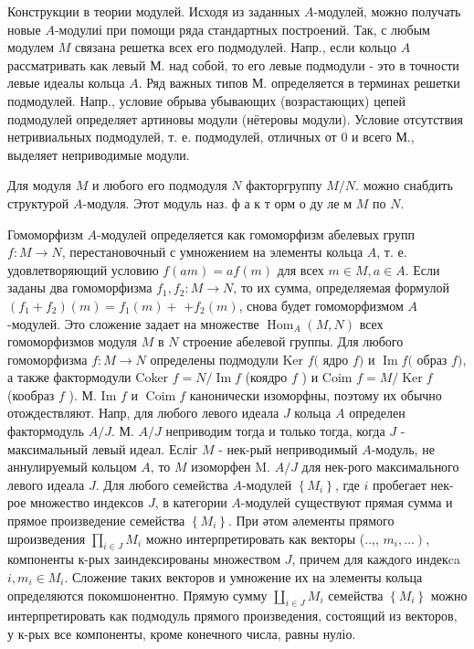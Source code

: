 \documentclass[10pt]{article}
\begin{document}
Конструкции в теории модулей. Исходя из заданных $A$-модулей, можно получать новые $A$-модулиі при помощи ряда стандартных построений. Так, с любым модулем $M$ связана решетка всех его подмодулей. Напр., если кольцо $A$ рассматривать как левый $М$. над собой, то его левые подмодули - это в точности левые идеалы кольца $A$. Ряд важных типов М. определяется в терминах решетки подмодулей. Напр., условие обрыва убывающих (возрастающих) цепей подмодулей определяет артиновы модули (нётеровы модули). Условие отсутствия нетривиальных подмодулей, т. е. подмодулей, отличных от 0 и всего М., выделяет неприводимые модули.



Для модуля $M$ и любого его подмодуля $N$ факторгруппу $M / N$. можно снабдить структурой $A$-модуля. Этот модуль наз. ф а к т орм о ду ле м $M$ по $N$.



Гомоморфизм $A$-модулей определяется как гомоморфизм абелевых групп $f: M \rightarrow N$, перестановочный с умножением на элементы кольца $A$, т. е. удовлетворяющий условию $f(a m)=a f(m)$ для всех $m \in M, a \in A$. Если заданы два гомоморфизма $f_{1}, f_{2}: M \rightarrow N$, то их сумма, определяемая формулой $\left(f_{1}+f_{2}\right)(m)=f_{1}(m)+$ $+f_{2}(m)$, снова будет гомоморфизмом $A$-модулей. Это сложение задает на множестве $\operatorname{Hom}_{A}(M, N)$ всех гомоморфизмов модуля $M$ в $N$ строение абелевой группы. Для любого гомоморфизма $f: M \rightarrow N$ определены подмодули Ker $f($ ядро $f)$ и $\operatorname{Im} f($ образ $f)$, а также фактормодули Coker $f=N / \operatorname{Im} f$ (коядро $f$ ) и Coim $f=M / \operatorname{Ker} f$ (кообраз $f$ ). М. Im $f$ и $\operatorname{Coim} f$ канонически изоморфны, поэтому их обычно отождествляют. Напр, для любого левого идеала $J$ кольца $A$ определен фактормодуль $A / J$. М. $A / J$ неприводим тогда и только тогда, когда $J$ - максимальный левый идеал. Есліг $M$ - нек-рый неприводимый $A$-модуль, не аннулируемый кольцом $A$, то $M$ изоморфен M. $A / J$ для нек-рого максимального левого идеала $J$. Для любого семейства $A$-модулей $\left\{M_{i}\right\}$, где $i$ пробегает нек-рое множество индексов $J$, в категории $A$-модулей существуют прямая сумма и прямое произведение семейства $\left\{M_{i}\right\}$. При әтом әлементы прямого шроизведения $\prod_{i \in J} M_{i}$ можно интерпретировать как векторы (..,, $\left.m_{i}, \ldots\right)$, компоненты к-рых заиндексированы множеством $J$, причем для каждого индекca $i, m_{i} \in M_{i}$. Сложение таких векторов и умножение их на элементы кольца определяются покомшонентно. Прямую сумму $\amalg_{i \in J} M_{i}$ семейства $\left\{M_{i}\right\}$ можно интерпретировать как подмодуль прямого произведения, состоящий из векторов, у к-рых все компоненты, кроме конечного числа, равны нуліо.
\end{document}
